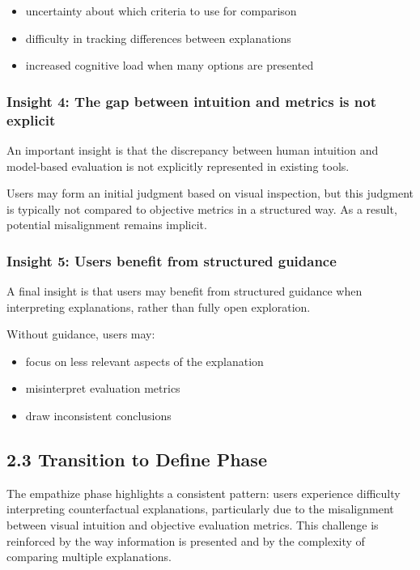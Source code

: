 \documentclass[
  letterpaper,
  DIV=11,
  numbers=noendperiod]{scrartcl}
\providecommand{\tightlist}{%
  \setlength{\itemsep}{0pt}\setlength{\parskip}{0pt}}\usepackage{longtable,booktabs,array}
\begin{document}
\begin{itemize}
\tightlist
\item
  uncertainty about which criteria to use for comparison
\item
  difficulty in tracking differences between explanations
\item
  increased cognitive load when many options are presented
\end{itemize}

\subsubsection{Insight 4: The gap between intuition and metrics is not
explicit}\label{insight-4-the-gap-between-intuition-and-metrics-is-not-explicit}

An important insight is that the discrepancy between human intuition and
model-based evaluation is not explicitly represented in existing tools.

Users may form an initial judgment based on visual inspection, but this
judgment is typically not compared to objective metrics in a structured
way. As a result, potential misalignment remains implicit.

\subsubsection{Insight 5: Users benefit from structured
guidance}\label{insight-5-users-benefit-from-structured-guidance}

A final insight is that users may benefit from structured guidance when
interpreting explanations, rather than fully open exploration.

Without guidance, users may:

\begin{itemize}
\tightlist
\item
  focus on less relevant aspects of the explanation
\item
  misinterpret evaluation metrics
\item
  draw inconsistent conclusions
\end{itemize}

\subsection{2.3 Transition to Define
Phase}\label{transition-to-define-phase}

The empathize phase highlights a consistent pattern: users experience
difficulty interpreting counterfactual explanations, particularly due to
the misalignment between visual intuition and objective evaluation
metrics. This challenge is reinforced by the way information is
presented and by the complexity of comparing multiple explanations.
\end{document}
